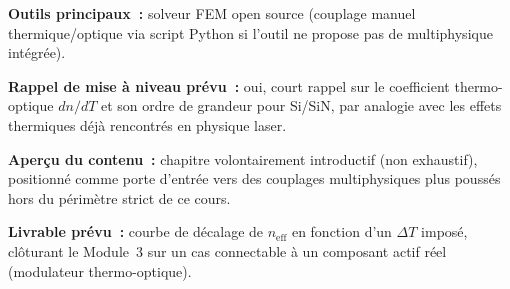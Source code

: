 \noindent\textbf{Outils principaux~:} solveur FEM open source (couplage manuel thermique/optique via script Python si l'outil ne propose pas de multiphysique intégrée).

\noindent\textbf{Rappel de mise à niveau prévu~:} oui, court rappel sur le coefficient thermo-optique $dn/dT$ et son ordre de grandeur pour Si/SiN, par analogie avec les effets thermiques déjà rencontrés en physique laser.

\noindent\textbf{Aperçu du contenu~:} chapitre volontairement introductif (non exhaustif), positionné comme porte d'entrée vers des couplages multiphysiques plus poussés hors du périmètre strict de ce cours.

\noindent\textbf{Livrable prévu~:} courbe de décalage de $n_{\text{eff}}$ en fonction d'un $\Delta T$ imposé, clôturant le Module~3 sur un cas connectable à un composant actif réel (modulateur thermo-optique).
